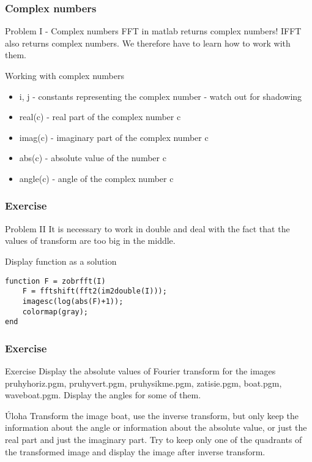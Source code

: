 \documentclass{beamer}
\begin{document}
\begin{frame}
\frametitle{Complex numbers}
  
  \begin{alertblock}{Problem I - Complex numbers}
    FFT in matlab returns complex numbers! IFFT also returns complex numbers. We therefore have to learn how to work with them.
  \end{alertblock}
  
  \begin{block}{Working with complex numbers}
  \begin{itemize}
  \item i, j - constants representing the complex number - watch out for shadowing
  \item real(c) - real part of the complex number c
  \item imag(c) - imaginary part of the complex number c
  \item abs(c) - absolute value of the number c
  \item angle(c) - angle of the complex number c
  \end{itemize}
  \end{block}
\end{frame}

\begin{frame}[fragile]
\frametitle{Exercise} 

  \begin{alertblock}{Problem II}
    It is necessary to work in double and deal with the fact that the values of transform are too big in the middle.
  \end{alertblock}

  \begin{block}{Display function as a solution}
  \begin{verbatim}
function F = zobrfft(I)
    F = fftshift(fft2(im2double(I)));
    imagesc(log(abs(F)+1));
    colormap(gray);
end \end{verbatim}
  \end{block}    
    
\end{frame}

\begin{frame}[fragile]
\frametitle{Exercise} 

  \begin{block}{Exercise}
    Display the absolute values of Fourier transform for the images pruhyhoriz.pgm, pruhyvert.pgm, pruhysikme.pgm, zatisie.pgm, boat.pgm, waveboat.pgm. Display the angles for some of them.
  \end{block}
  
    \begin{block}{Úloha}
    Transform the image boat, use the inverse transform, but only keep the information about the angle or information about the absolute value, or just the real part and just the imaginary part. Try to keep only one of the quadrants of the transformed image and display the image after inverse transform.
  \end{block}  
\end{frame}
\end{document}
